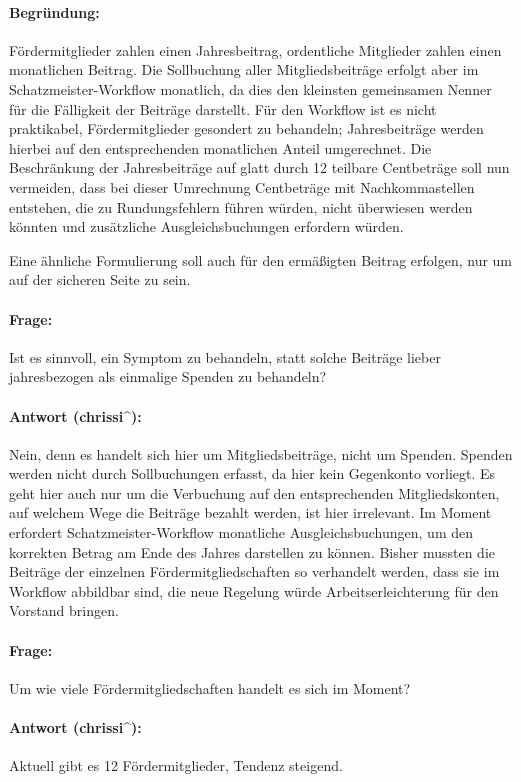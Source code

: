 \documentclass[parskip=half-]{s0minutes}
\begin{document}
\paragraph{Begründung:} Fördermitglieder zahlen einen Jahresbeitrag, ordentliche
Mitglieder zahlen einen monatlichen Beitrag. Die Sollbuchung aller
Mitgliedsbeiträge erfolgt aber im Schatzmeister-Workflow monatlich, da dies den
kleinsten gemeinsamen Nenner für die Fälligkeit der Beiträge darstellt. Für den
Workflow ist es nicht praktikabel, Fördermitglieder gesondert zu behandeln;
Jahresbeiträge werden hierbei auf den entsprechenden monatlichen Anteil
umgerechnet. Die Beschränkung der Jahresbeiträge auf glatt durch 12 teilbare
Centbeträge soll nun vermeiden, dass bei dieser Umrechnung Centbeträge mit
Nachkommastellen entstehen, die zu Rundungsfehlern führen würden, nicht
überwiesen werden könnten und zusätzliche Ausgleichsbuchungen erfordern würden.

Eine ähnliche Formulierung soll auch für den ermäßigten Beitrag erfolgen, nur um
auf der sicheren Seite zu sein.

\paragraph{Frage:} Ist es sinnvoll, ein Symptom zu behandeln, statt solche
Beiträge lieber jahresbezogen als einmalige Spenden zu behandeln?
\paragraph{Antwort (chrissi\^{}):} Nein, denn es handelt sich hier um
Mitgliedsbeiträge, nicht um Spenden. Spenden werden nicht durch Sollbuchungen erfasst,
da hier kein Gegenkonto vorliegt. Es geht hier auch nur um die Verbuchung auf
den entsprechenden Mitgliedskonten, auf welchem Wege die Beiträge bezahlt
werden, ist hier irrelevant. Im Moment erfordert Schatzmeister-Workflow
monatliche Ausgleichsbuchungen, um den korrekten Betrag am Ende des Jahres
darstellen zu können. Bisher mussten die Beiträge der einzelnen
Fördermitgliedschaften so verhandelt werden, dass sie im Workflow abbildbar
sind, die neue Regelung würde Arbeitserleichterung für den Vorstand bringen.

\paragraph{Frage:} Um wie viele Fördermitgliedschaften handelt es sich im
Moment?
\paragraph{Antwort (chrissi\^{}):} Aktuell gibt es 12 Fördermitglieder, Tendenz
steigend.
\end{document}
